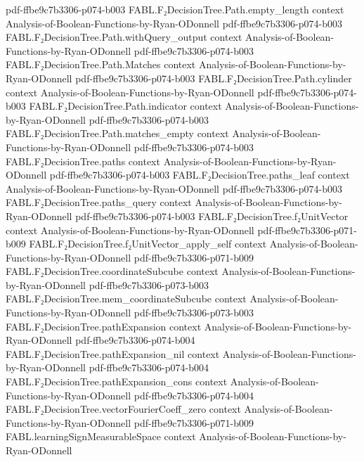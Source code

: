 \begin{theorem}
  {pdf-ffbe9c7b3306-p074-b003}
\proofstep
  {FABL.F₂DecisionTree.Path.empty_length}
  {context}
  {Analysis-of-Boolean-Functions-by-Ryan-ODonnell}
  {pdf-ffbe9c7b3306-p074-b003}
\proofstep
  {FABL.F₂DecisionTree.Path.withQuery_output}
  {context}
  {Analysis-of-Boolean-Functions-by-Ryan-ODonnell}
  {pdf-ffbe9c7b3306-p074-b003}
\proofstep
  {FABL.F₂DecisionTree.Path.Matches}
  {context}
  {Analysis-of-Boolean-Functions-by-Ryan-ODonnell}
  {pdf-ffbe9c7b3306-p074-b003}
\proofstep
  {FABL.F₂DecisionTree.Path.cylinder}
  {context}
  {Analysis-of-Boolean-Functions-by-Ryan-ODonnell}
  {pdf-ffbe9c7b3306-p074-b003}
\proofstep
  {FABL.F₂DecisionTree.Path.indicator}
  {context}
  {Analysis-of-Boolean-Functions-by-Ryan-ODonnell}
  {pdf-ffbe9c7b3306-p074-b003}
\proofstep
  {FABL.F₂DecisionTree.Path.matches_empty}
  {context}
  {Analysis-of-Boolean-Functions-by-Ryan-ODonnell}
  {pdf-ffbe9c7b3306-p074-b003}
\proofstep
  {FABL.F₂DecisionTree.paths}
  {context}
  {Analysis-of-Boolean-Functions-by-Ryan-ODonnell}
  {pdf-ffbe9c7b3306-p074-b003}
\proofstep
  {FABL.F₂DecisionTree.paths_leaf}
  {context}
  {Analysis-of-Boolean-Functions-by-Ryan-ODonnell}
  {pdf-ffbe9c7b3306-p074-b003}
\proofstep
  {FABL.F₂DecisionTree.paths_query}
  {context}
  {Analysis-of-Boolean-Functions-by-Ryan-ODonnell}
  {pdf-ffbe9c7b3306-p074-b003}
\proofstep
  {FABL.F₂DecisionTree.f₂UnitVector}
  {context}
  {Analysis-of-Boolean-Functions-by-Ryan-ODonnell}
  {pdf-ffbe9c7b3306-p071-b009}
\proofstep
  {FABL.F₂DecisionTree.f₂UnitVector_apply_self}
  {context}
  {Analysis-of-Boolean-Functions-by-Ryan-ODonnell}
  {pdf-ffbe9c7b3306-p071-b009}
\proofstep
  {FABL.F₂DecisionTree.coordinateSubcube}
  {context}
  {Analysis-of-Boolean-Functions-by-Ryan-ODonnell}
  {pdf-ffbe9c7b3306-p073-b003}
\proofstep
  {FABL.F₂DecisionTree.mem_coordinateSubcube}
  {context}
  {Analysis-of-Boolean-Functions-by-Ryan-ODonnell}
  {pdf-ffbe9c7b3306-p073-b003}
\proofstep
  {FABL.F₂DecisionTree.pathExpansion}
  {context}
  {Analysis-of-Boolean-Functions-by-Ryan-ODonnell}
  {pdf-ffbe9c7b3306-p074-b004}
\proofstep
  {FABL.F₂DecisionTree.pathExpansion_nil}
  {context}
  {Analysis-of-Boolean-Functions-by-Ryan-ODonnell}
  {pdf-ffbe9c7b3306-p074-b004}
\proofstep
  {FABL.F₂DecisionTree.pathExpansion_cons}
  {context}
  {Analysis-of-Boolean-Functions-by-Ryan-ODonnell}
  {pdf-ffbe9c7b3306-p074-b004}
\proofstep
  {FABL.F₂DecisionTree.vectorFourierCoeff_zero}
  {context}
  {Analysis-of-Boolean-Functions-by-Ryan-ODonnell}
  {pdf-ffbe9c7b3306-p071-b009}
\proofstep
  {FABL.learningSignMeasurableSpace}
  {context}
  {Analysis-of-Boolean-Functions-by-Ryan-ODonnell}

\end{theorem}
